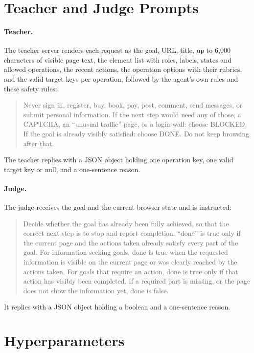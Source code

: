 \documentclass{article}
\begin{document}



\newpage
\appendix
\onecolumn

\section{Teacher and Judge Prompts}
\label{app:prompts}

\paragraph{Teacher.} The teacher server renders each request as the goal, URL, title, up to 6{,}000 characters of
visible page text, the element list with roles, labels, states and allowed operations, the recent actions, the
operation options with their rubrics, and the valid target keys per operation, followed by the agent's own rules and
these safety rules:
\begin{quote}\small
Never sign in, register, buy, book, pay, post, comment, send messages, or submit personal information. If the next step
would need any of those, a CAPTCHA, an ``unusual traffic'' page, or a login wall: choose BLOCKED. If the goal is already
visibly satisfied: choose DONE. Do not keep browsing after that.
\end{quote}
The teacher replies with a JSON object holding one operation key, one valid target key or null, and a one-sentence
reason.

\paragraph{Judge.} The judge receives the goal and the current browser state and is instructed:
\begin{quote}\small
Decide whether the goal has already been fully achieved, so that the correct next step is to stop and report
completion. ``done'' is true only if the current page and the actions taken already satisfy every part of the goal. For
information-seeking goals, done is true when the requested information is visible on the current page or was clearly
reached by the actions taken. For goals that require an action, done is true only if that action has visibly been
completed. If a required part is missing, or the page does not show the information yet, done is false.
\end{quote}
It replies with a JSON object holding a boolean and a one-sentence reason.

\section{Hyperparameters}
\label{app:hparams}
\end{document}

